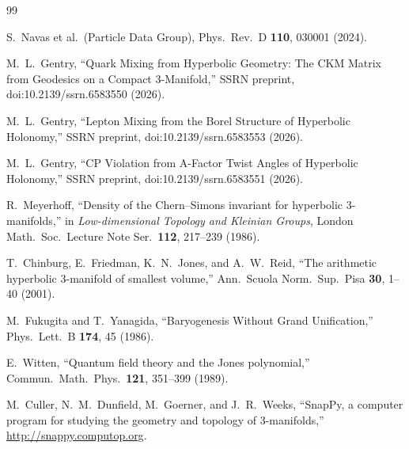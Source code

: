 \documentclass[12pt]{article}
\theoremstyle{definition}
\begin{document}
\begin{thebibliography}{99}

  S.~Navas et al.\ (Particle Data Group),
  Phys.\ Rev.\ D \textbf{110}, 030001 (2024).

  M.~L.~Gentry,
  ``Quark Mixing from Hyperbolic Geometry: The CKM Matrix from
  Geodesics on a Compact 3-Manifold,''
  SSRN preprint, doi:10.2139/ssrn.6583550 (2026).

  M.~L.~Gentry,
  ``Lepton Mixing from the Borel Structure of Hyperbolic Holonomy,''
  SSRN preprint, doi:10.2139/ssrn.6583553 (2026).

  M.~L.~Gentry,
  ``CP Violation from A-Factor Twist Angles of Hyperbolic Holonomy,''
  SSRN preprint, doi:10.2139/ssrn.6583551 (2026).

  R.~Meyerhoff,
  ``Density of the Chern--Simons invariant for hyperbolic 3-manifolds,''
  in \emph{Low-dimensional Topology and Kleinian Groups},
  London Math.\ Soc.\ Lecture Note Ser.\ \textbf{112}, 217--239 (1986).

  T.~Chinburg, E.~Friedman, K.~N.~Jones, and A.~W.~Reid,
  ``The arithmetic hyperbolic 3-manifold of smallest volume,''
  Ann.\ Scuola Norm.\ Sup.\ Pisa \textbf{30}, 1--40 (2001).

  M.~Fukugita and T.~Yanagida,
  ``Baryogenesis Without Grand Unification,''
  Phys.\ Lett.\ B \textbf{174}, 45 (1986).

  E.~Witten,
  ``Quantum field theory and the Jones polynomial,''
  Commun.\ Math.\ Phys.\ \textbf{121}, 351--399 (1989).

  M.~Culler, N.~M.~Dunfield, M.~Goerner, and J.~R.~Weeks,
  ``SnapPy, a computer program for studying the geometry and topology
  of 3-manifolds,'' \url{http://snappy.computop.org}.

\end{thebibliography}
\end{document}
